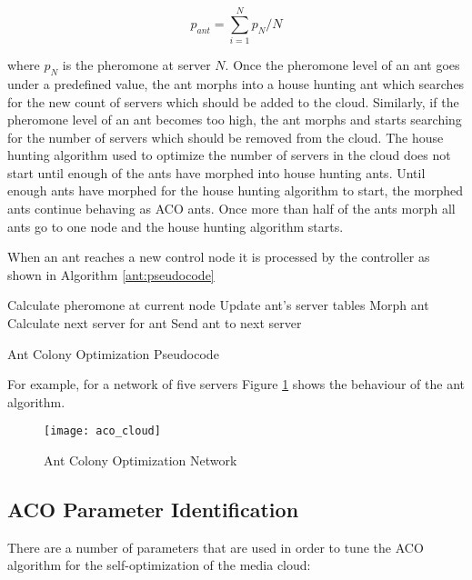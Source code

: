 \begin{equation}
p_{ant} = \sum_{i=1}^{N} p_{N} / N
\end{equation}

where $p_{N}$ is the pheromone at server $N$. Once the pheromone level of an ant goes under a predefined value, the ant morphs into a house hunting ant which searches for the new count of servers which should be added to the cloud. Similarly, if the pheromone level of an ant becomes too high, the ant morphs and starts searching for the number of servers which should be removed from the cloud. The house hunting algorithm used to optimize the number of servers in the cloud does not start until enough of the ants have morphed into house hunting ants. Until enough ants have morphed for the house hunting algorithm to start, the morphed ants continue behaving as ACO ants. Once more than half of the ants morph all ants go to one node and the house hunting algorithm starts.

When an ant reaches a new control node it is processed by the controller as shown in Algorithm \ref{ant:pseudocode}

\begin{algorithm}
\begin{algorithmic}
	\State Calculate pheromone at current node
	\State Update ant's server tables
		\State Morph ant
	\Else
		\State Calculate next server for ant
		\State Send ant to next server
	\EndIf
\end{algorithmic}
\caption{Ant Colony Optimization Pseudocode}\label{ant:pseudocode}
\end{algorithm}

For example, for a network of five servers Figure \ref{fig:antnetwork} shows the behaviour of the ant algorithm.

\begin{figure}
	\centering
	\texttt{[image: aco\_cloud]}
	\caption{Ant Colony Optimization Network}
	\label{fig:antnetwork}
\end{figure}

\subsection{ACO Parameter Identification}

There are a number of parameters that are used in order to tune the ACO algorithm for the self-optimization of the media cloud:

